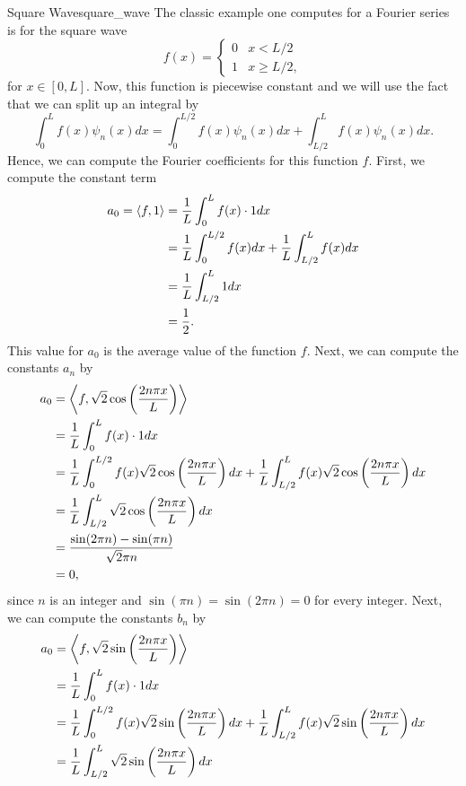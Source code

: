 \begin{ex}{Square Wave}{square_wave}
	The classic example one computes for a Fourier series is for the square wave
	\[
	f(x) = \begin{cases} 0 & x<L/2 \\ 1 & x\geq L/2, \end{cases}
	\]
	for $x \in [0,L]$.  Now, this function is piecewise constant and we will use the fact that we can split up an integral by
	\[
	\int_0^L f(x)\psi_n(x)dx = \int_0^{L/2} f(x)\psi_n(x)dx + \int_{L/2}^L f(x)\psi_n(x)dx.
	\]
	Hence, we can compute the Fourier coefficients for this function $f$.  First, we compute the constant term
	\begin{align*}
		a_0 = \left\langle f, 1 \right\rangle &= \frac{1}{L}\int_0^L f(x)\cdot 1 dx \\
		&= \frac{1}{L} \int_0^{L/2} f(x)dx + \frac{1}{L}\int_{L/2}^L f(x) dx\\
		&= \frac{1}{L} \int_{L/2}^L 1 dx\\
		&= \frac{1}{2}.
	\end{align*}
	This value for $a_0$ is the average value of the function $f$.  Next, we can compute the constants $a_n$ by
	\begin{align*}
			a_0 &= \left\langle f, \sqrt{2}\cos\left(\frac{2n \pi x}L\right) \right\rangle\\
			 &= \frac{1}{L}\int_0^L f(x)\cdot 1 dx \\
			&= \frac{1}{L} \int_0^{L/2} f(x) \sqrt{2}\cos\left(\frac{2n \pi x}{L}\right)dx + \frac{1}{L}\int_{L/2}^L f(x)\sqrt{2}\cos\left(\frac{2n \pi x}{L}\right) dx\\
			&= \frac{1}{L} \int_{L/2}^L \sqrt{2}\cos\left(\frac{2n \pi x}{L}\right) dx\\
			&= \frac{\sin(2\pi n)-\sin(\pi n)}{\sqrt{2} \pi n}\\
			&= 0,
		\end{align*}
		since $n$ is an integer and $\sin(\pi n)=\sin(2\pi n)=0$ for every integer.  Next, we can compute the constants $b_n$ by
		\begin{align*}
					a_0 &= \innprod{f}{\sqrt{2}\sin\left(\frac{2n \pi x}L\right)}\\
					 &= \frac{1}{L}\int_0^L f(x)\cdot 1 dx \\
					&= \frac{1}{L} \int_0^{L/2} f(x) \sqrt{2}\sin\left(\frac{2n \pi x}{L}\right)dx + \frac{1}{L}\int_{L/2}^L f(x)\sqrt{2}\sin\left(\frac{2n \pi x}{L}\right) dx\\
					&= \frac{1}{L} \int_{L/2}^L \sqrt{2}\sin\left(\frac{2n \pi x}{L}\right) dx\\

\end{align*}
\end{ex}
